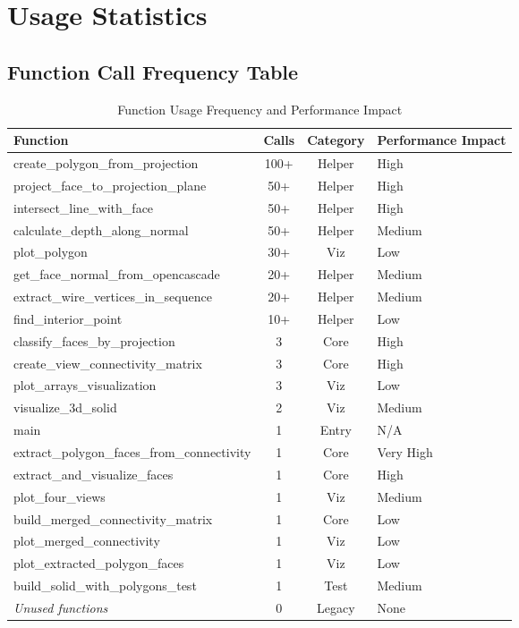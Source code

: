 \documentclass[11pt,a4paper]{article}
\begin{document}
\newpage
\section{Usage Statistics}

\subsection{Function Call Frequency Table}

\begin{table}[htbp]
\centering
\begin{tabular}{lccl}
\toprule
\textbf{Function} & \textbf{Calls} & \textbf{Category} & \textbf{Performance Impact} \\
\midrule
create\_polygon\_from\_projection & 100+ & Helper & High \\
project\_face\_to\_projection\_plane & 50+ & Helper & High \\
intersect\_line\_with\_face & 50+ & Helper & High \\
calculate\_depth\_along\_normal & 50+ & Helper & Medium \\
plot\_polygon & 30+ & Viz & Low \\
get\_face\_normal\_from\_opencascade & 20+ & Helper & Medium \\
extract\_wire\_vertices\_in\_sequence & 20+ & Helper & Medium \\
find\_interior\_point & 10+ & Helper & Low \\
classify\_faces\_by\_projection & 3 & Core & High \\
create\_view\_connectivity\_matrix & 3 & Core & High \\
plot\_arrays\_visualization & 3 & Viz & Low \\
visualize\_3d\_solid & 2 & Viz & Medium \\
main & 1 & Entry & N/A \\
extract\_polygon\_faces\_from\_connectivity & 1 & Core & Very High \\
extract\_and\_visualize\_faces & 1 & Core & High \\
plot\_four\_views & 1 & Viz & Medium \\
build\_merged\_connectivity\_matrix & 1 & Core & Low \\
plot\_merged\_connectivity & 1 & Viz & Low \\
plot\_extracted\_polygon\_faces & 1 & Viz & Low \\
build\_solid\_with\_polygons\_test & 1 & Test & Medium \\
\midrule
\textit{Unused functions} & 0 & Legacy & None \\
\bottomrule
\end{tabular}
\caption{Function Usage Frequency and Performance Impact}
\label{tab:usage_stats}
\end{table}
\end{document}
